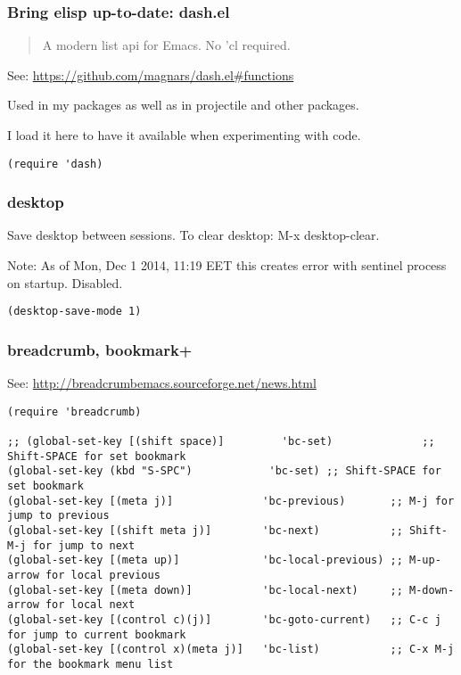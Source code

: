 \documentclass{article}
\begin{document}
\subsubsection{Bring elisp up-to-date: dash.el}
\label{sec-1-11-3}

\begin{quote}
A modern list api for Emacs. No 'cl required.
\end{quote}

See: \url{https://github.com/magnars/dash.el#functions}

Used in my packages as well as in projectile and other packages.

I load it here to have it available when experimenting with code.

\begin{verbatim}
(require 'dash)
\end{verbatim}
\subsubsection{desktop}
\label{sec-1-11-4}

Save desktop between sessions.  To clear desktop: M-x desktop-clear.

Note: As of Mon, Dec  1 2014, 11:19 EET this creates error with sentinel process on startup.  Disabled.

\begin{verbatim}
(desktop-save-mode 1)
\end{verbatim}

\subsubsection{breadcrumb, bookmark+}
\label{sec-1-11-5}

See: \url{http://breadcrumbemacs.sourceforge.net/news.html}

\begin{verbatim}
(require 'breadcrumb)

;; (global-set-key [(shift space)]         'bc-set)              ;; Shift-SPACE for set bookmark
(global-set-key (kbd "S-SPC")            'bc-set) ;; Shift-SPACE for set bookmark
(global-set-key [(meta j)]              'bc-previous)       ;; M-j for jump to previous
(global-set-key [(shift meta j)]        'bc-next)           ;; Shift-M-j for jump to next
(global-set-key [(meta up)]             'bc-local-previous) ;; M-up-arrow for local previous
(global-set-key [(meta down)]           'bc-local-next)     ;; M-down-arrow for local next
(global-set-key [(control c)(j)]        'bc-goto-current)   ;; C-c j for jump to current bookmark
(global-set-key [(control x)(meta j)]   'bc-list)           ;; C-x M-j for the bookmark menu list
\end{verbatim}
\end{document}
